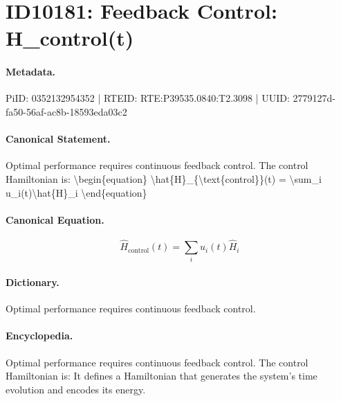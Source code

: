 \section*{ID10181: Feedback Control: H\_control(t)}
\paragraph{Metadata.}
PiID: 0352132954352 | RTEID: RTE:P39535.0840:T2.3098 | UUID: 2779127d-fa50-56af-ac8b-18593eda03c2

\paragraph{Canonical Statement.}
Optimal performance requires continuous feedback control. The control Hamiltonian is: \textbackslash{}begin\{equation\} \textbackslash{}hat\{H\}\_\{\textbackslash{}text\{control\}\}(t) = \textbackslash{}sum\_i u\_i(t)\textbackslash{}hat\{H\}\_i \textbackslash{}end\{equation\}

\paragraph{Canonical Equation.}
\[
\hat{H}_{\text{control}}(t) = \sum_i u_i(t)\hat{H}_i
\]

\paragraph{Dictionary.}
Optimal performance requires continuous feedback control.

\paragraph{Encyclopedia.}
Optimal performance requires continuous feedback control. The control Hamiltonian is: It defines a Hamiltonian that generates the system's time evolution and encodes its energy.
